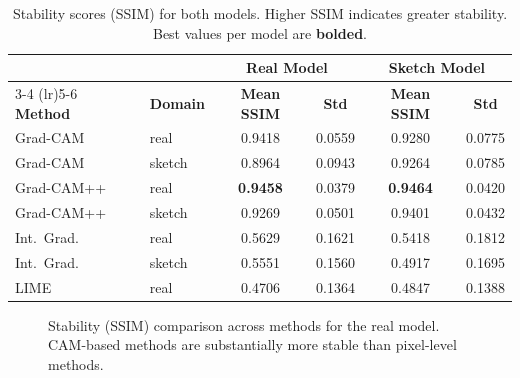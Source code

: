 \documentclass[12pt, a4paper]{article}
\begin{document}
\begin{table}[H]
\centering
\caption{Stability scores (SSIM) for both models.  Higher SSIM indicates
greater stability.  Best values per model are \textbf{bolded}.}
\label{tab:stability}
\begin{tabular}{llcccc}
\toprule
& & \multicolumn{2}{c}{\textbf{Real Model}} & \multicolumn{2}{c}{\textbf{Sketch Model}} \\
\cmidrule(lr){3-4} \cmidrule(lr){5-6}
\textbf{Method} & \textbf{Domain} & \textbf{Mean SSIM} & \textbf{Std}
& \textbf{Mean SSIM} & \textbf{Std} \\
\midrule
Grad-CAM   & real   & 0.9418 & 0.0559 & 0.9280 & 0.0775 \\
Grad-CAM   & sketch & 0.8964 & 0.0943 & 0.9264 & 0.0785 \\
Grad-CAM++ & real   & \textbf{0.9458} & 0.0379 & \textbf{0.9464} & 0.0420 \\
Grad-CAM++ & sketch & 0.9269 & 0.0501 & 0.9401 & 0.0432 \\
Int.~Grad. & real   & 0.5629 & 0.1621 & 0.5418 & 0.1812 \\
Int.~Grad. & sketch & 0.5551 & 0.1560 & 0.4917 & 0.1695 \\
LIME       & real   & 0.4706 & 0.1364 & 0.4847 & 0.1388 \\
\bottomrule
\end{tabular}
\end{table}

\begin{figure}[H]
\centering
{}
\caption{Stability (SSIM) comparison across methods for the real model.
CAM-based methods are substantially more stable than pixel-level methods.}
\label{fig:stability_real}
\end{figure}
\end{document}
